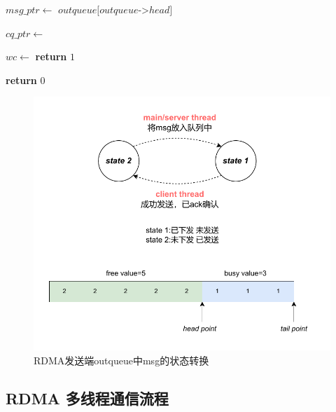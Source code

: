 {\begin{algorithm}
\begin{algorithmic}[1]
            \State
            \State $msg\_ptr \gets$ $outqueue[outqueue$->$head]$

            \EndWhile

            \State
            \State $cq\_ptr \gets$ 
            \State {}

            \State
            \State $wc \gets$ 
                \State \textbf{return} $1$
            \EndIf

            \State
            \State {}
            \State \textbf{return} $0$
        \EndFunction
    \end{algorithmic}
\end{algorithm}

\begin{figure}[H]
    \centering
    \includegraphics[width=1.0\textwidth]{Img/send_state.drawio.pdf}
    \caption{RDMA发送端outqueue中msg的状态转换}
\end{figure}


\newpage
\subsection{RDMA 多线程通信流程}

}
